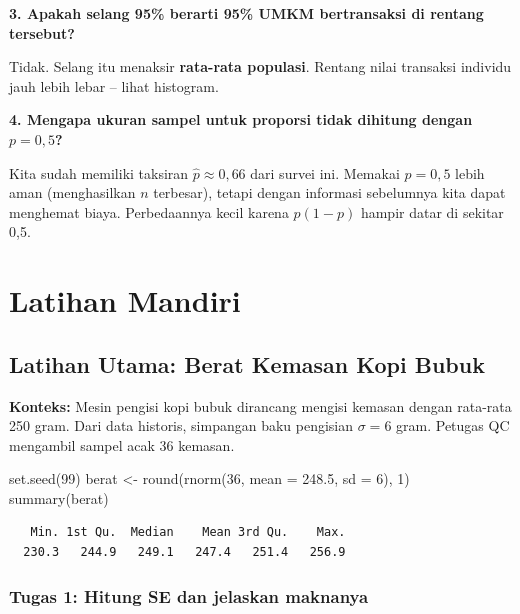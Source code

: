 \documentclass[
  indonesian,
  letterpaper,
]{book}
\newenvironment{Shaded}{\begin{snugshade}}{\end{snugshade}}
\newcommand{\AttributeTok}[1]{\textcolor[rgb]{0.40,0.45,0.13}{#1}}
\newcommand{\DecValTok}[1]{\textcolor[rgb]{0.68,0.00,0.00}{#1}}
\newcommand{\FloatTok}[1]{\textcolor[rgb]{0.68,0.00,0.00}{#1}}
\newcommand{\FunctionTok}[1]{\textcolor[rgb]{0.28,0.35,0.67}{#1}}
\newcommand{\NormalTok}[1]{\textcolor[rgb]{0.00,0.23,0.31}{#1}}
\newcommand{\OtherTok}[1]{\textcolor[rgb]{0.00,0.23,0.31}{#1}}
\begin{document}
\textbf{3. Apakah selang 95\% berarti 95\% UMKM bertransaksi di rentang
tersebut?}

Tidak. Selang itu menaksir \textbf{rata-rata populasi}. Rentang nilai
transaksi individu jauh lebih lebar -- lihat histogram.

\textbf{4. Mengapa ukuran sampel untuk proporsi tidak dihitung dengan
\(p = 0{,}5\)?}

Kita sudah memiliki taksiran \(\hat{p} \approx 0{,}66\) dari survei ini.
Memakai \(p = 0{,}5\) lebih aman (menghasilkan \(n\) terbesar), tetapi
dengan informasi sebelumnya kita dapat menghemat biaya. Perbedaannya
kecil karena \(p(1-p)\) hampir datar di sekitar 0,5.

\section{Latihan Mandiri}\label{latihan-mandiri}

\subsection{Latihan Utama: Berat Kemasan Kopi
Bubuk}\label{latihan-utama-berat-kemasan-kopi-bubuk}

\textbf{Konteks:} Mesin pengisi kopi bubuk dirancang mengisi kemasan
dengan rata-rata 250 gram. Dari data historis, simpangan baku pengisian
\(\sigma = 6\) gram. Petugas QC mengambil sampel acak 36 kemasan.

\begin{Shaded}
\begin{Highlighting}[]
\FunctionTok{set.seed}\NormalTok{(}\DecValTok{99}\NormalTok{)}
\NormalTok{berat }\OtherTok{\textless{}{-}} \FunctionTok{round}\NormalTok{(}\FunctionTok{rnorm}\NormalTok{(}\DecValTok{36}\NormalTok{, }\AttributeTok{mean =} \FloatTok{248.5}\NormalTok{, }\AttributeTok{sd =} \DecValTok{6}\NormalTok{), }\DecValTok{1}\NormalTok{)}
\FunctionTok{summary}\NormalTok{(berat)}
\end{Highlighting}
\end{Shaded}

\begin{verbatim}
   Min. 1st Qu.  Median    Mean 3rd Qu.    Max. 
  230.3   244.9   249.1   247.4   251.4   256.9 
\end{verbatim}

\subsubsection{Tugas 1: Hitung SE dan jelaskan
maknanya}\label{tugas-1-hitung-se-dan-jelaskan-maknanya}
\end{document}
